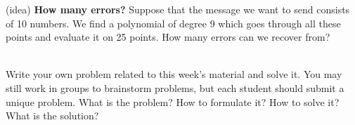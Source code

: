 \documentclass[]{article}
\newif\ifsolutions
\renewcommand{\answer}[1]{{\color{mydarkblue}\textbf{Solution:}#1}}
\begin{document}
\begin{qunlist}
\begin{enumerate}
\end{enumerate}

\qpart
(idea) {\bf How many errors?}
Suppose that the message we want to send consists of 10 numbers. We find a polynomial of degree 9 which goes through all these points and evaluate it on 25 points. How many errors can we recover from?

\ifsolutions{ \answer 
{
For $ k $ erasure errors, we need to send $ k $ additional packets for a total of $ n+k $. Here, $ n=10 $ and $ n+k=25 $, so we can recover from 15 erasure errors.

For $ k $ general errors, we need $ 2k $ additional packets. We have 15 additional packets, so we may recover from $ \lfloor 15/2 \rfloor = 7 $ general errors.
}}\fi


 \\
Write your own problem related to this week's material and solve it. 
You may still work in groups to brainstorm problems, 
but each student should submit a unique problem.  
What is the problem? How to formulate it? 
How to solve it? What is the solution?
  
  
    
\end{qunlist}
\end{document}
